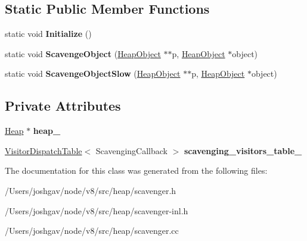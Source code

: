 \subsection*{Static Public Member Functions}
\begin{DoxyCompactItemize}
\item 
static void {\bfseries Initialize} ()\hypertarget{classv8_1_1internal_1_1_scavenger_a836b4b18e6aae92915b7233f4412c113}{}\label{classv8_1_1internal_1_1_scavenger_a836b4b18e6aae92915b7233f4412c113}

\item 
static void {\bfseries Scavenge\+Object} (\hyperlink{classv8_1_1internal_1_1_heap_object}{Heap\+Object} $\ast$$\ast$p, \hyperlink{classv8_1_1internal_1_1_heap_object}{Heap\+Object} $\ast$object)\hypertarget{classv8_1_1internal_1_1_scavenger_a463639e66b8387e57b0ab55bd960a08b}{}\label{classv8_1_1internal_1_1_scavenger_a463639e66b8387e57b0ab55bd960a08b}

\item 
static void {\bfseries Scavenge\+Object\+Slow} (\hyperlink{classv8_1_1internal_1_1_heap_object}{Heap\+Object} $\ast$$\ast$p, \hyperlink{classv8_1_1internal_1_1_heap_object}{Heap\+Object} $\ast$object)\hypertarget{classv8_1_1internal_1_1_scavenger_aefd1aef15d7d06d61d718faa81f8dae5}{}\label{classv8_1_1internal_1_1_scavenger_aefd1aef15d7d06d61d718faa81f8dae5}

\end{DoxyCompactItemize}
\subsection*{Private Attributes}
\begin{DoxyCompactItemize}
\item 
\hyperlink{classv8_1_1internal_1_1_heap}{Heap} $\ast$ {\bfseries heap\+\_\+}\hypertarget{classv8_1_1internal_1_1_scavenger_a8c404095ae5899d8d8a939e43960bc95}{}\label{classv8_1_1internal_1_1_scavenger_a8c404095ae5899d8d8a939e43960bc95}

\item 
\hyperlink{classv8_1_1internal_1_1_visitor_dispatch_table}{Visitor\+Dispatch\+Table}$<$ Scavenging\+Callback $>$ {\bfseries scavenging\+\_\+visitors\+\_\+table\+\_\+}\hypertarget{classv8_1_1internal_1_1_scavenger_ab85b362d360eeee9c151d22cfa52e0aa}{}\label{classv8_1_1internal_1_1_scavenger_ab85b362d360eeee9c151d22cfa52e0aa}

\end{DoxyCompactItemize}


The documentation for this class was generated from the following files\+:\begin{DoxyCompactItemize}
\item 
/\+Users/joshgav/node/v8/src/heap/scavenger.\+h\item 
/\+Users/joshgav/node/v8/src/heap/scavenger-\/inl.\+h\item 
/\+Users/joshgav/node/v8/src/heap/scavenger.\+cc\end{DoxyCompactItemize}
